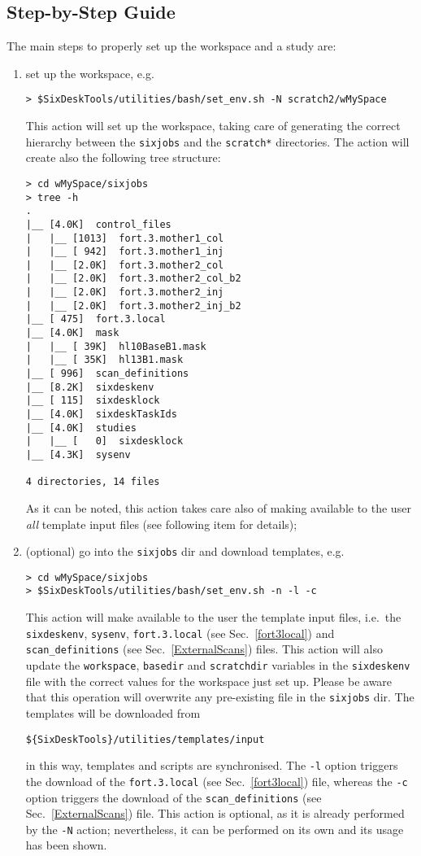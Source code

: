 \subsection{Step-by-Step Guide}
The main steps to properly set up the workspace and a study are:
\begin{enumerate}
\item set up the workspace, e.g.
\begin{lstlisting}
> $SixDeskTools/utilities/bash/set_env.sh -N scratch2/wMySpace
\end{lstlisting}
This action will set up the workspace, taking care of generating
the correct hierarchy between the \texttt{sixjobs} and the \texttt{scratch*}
directories. The action will create also the following tree structure:
\begin{lstlisting}
> cd wMySpace/sixjobs
> tree -h
.
|__ [4.0K]  control_files
|   |__ [1013]  fort.3.mother1_col
|   |__ [ 942]  fort.3.mother1_inj
|   |__ [2.0K]  fort.3.mother2_col
|   |__ [2.0K]  fort.3.mother2_col_b2
|   |__ [2.0K]  fort.3.mother2_inj
|   |__ [2.0K]  fort.3.mother2_inj_b2
|__ [ 475]  fort.3.local
|__ [4.0K]  mask
|   |__ [ 39K]  hl10BaseB1.mask
|   |__ [ 35K]  hl13B1.mask
|__ [ 996]  scan_definitions
|__ [8.2K]  sixdeskenv
|__ [ 115]  sixdesklock
|__ [4.0K]  sixdeskTaskIds
|__ [4.0K]  studies
|   |__ [   0]  sixdesklock
|__ [4.3K]  sysenv

4 directories, 14 files
\end{lstlisting}
As it can be noted, this action takes care also of making available
to the user \emph{all} template input files (see following item
for details);
\item (optional) go into the \texttt{sixjobs} dir and download templates,
  e.g.
\begin{lstlisting}
> cd wMySpace/sixjobs
> $SixDeskTools/utilities/bash/set_env.sh -n -l -c
\end{lstlisting}
This action will make available to the user the template
input files, i.e.~the \texttt{sixdeskenv}, \texttt{sysenv},
\texttt{fort.3.local} (see Sec.~\ref{fort3local}) and
\texttt{scan\_definitions} (see Sec.~\ref{ExternalScans}) files.
This action will also update
the \texttt{workspace}, \texttt{basedir} and \texttt{scratchdir}
variables in the \texttt{sixdeskenv} file
with the correct values for the workspace just set up.
Please be aware that this operation will overwrite any
pre-existing file in the \texttt{sixjobs} dir. The templates
will be downloaded from
\begin{lstlisting}
${SixDeskTools}/utilities/templates/input
\end{lstlisting}
in this way, templates and scripts are synchronised.
The \texttt{-l} option triggers the download of the
\texttt{fort.3.local} (see Sec.~\ref{fort3local}) file, whereas
the \texttt{-c} option triggers the download of the
\texttt{scan\_definitions} (see Sec.~\ref{ExternalScans}) file.
This action is optional, as it is already performed by the
\texttt{-N} action; nevertheless, it can be performed on its
own and its usage has been shown.
\end{enumerate}

